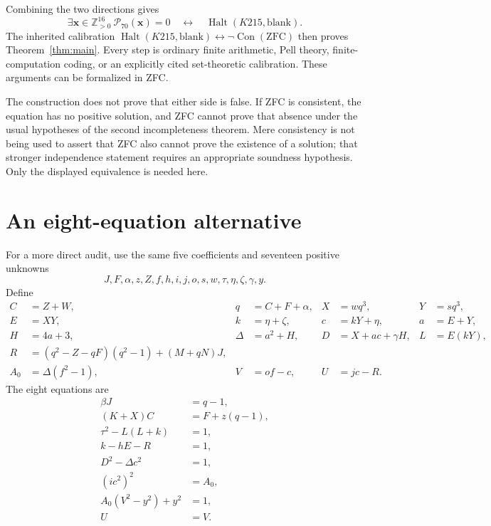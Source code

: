\documentclass[11pt]{article}
\theoremstyle{definition}
\newcommand{\Pos}{\mathbb Z_{>0}}
\newcommand{\Con}{\operatorname{Con}}
\newcommand{\Halt}{\operatorname{Halt}}
\newcommand{\norms}{\mathcal P}
\begin{document}
Combining the two directions gives
\[
 \exists\mathbf x\in\Pos^{16}\ \norms_{70}(\mathbf x)=0
 \quad\longleftrightarrow\quad
 \Halt(K215,\mathrm{blank}).
\]
The inherited calibration
$\Halt(K215,\mathrm{blank})\leftrightarrow\neg\Con(\mathrm{ZFC})$
then proves Theorem~\ref{thm:main}. Every step is ordinary finite arithmetic,
Pell theory, finite-computation coding, or an explicitly cited set-theoretic
calibration. These arguments can be formalized in ZFC.

The construction does not prove that either side is false. If ZFC is
consistent, the equation has no positive solution, and ZFC cannot prove
that absence under the usual hypotheses of the second incompleteness
theorem. Mere consistency is not being used to assert that ZFC also cannot
prove the existence of a solution; that stronger independence statement
requires an appropriate soundness hypothesis. Only the displayed
equivalence is needed here.

\section{An eight-equation alternative}
\label{sec:system}

For a more direct audit, use the same five coefficients and seventeen
positive unknowns
\[
 J,F,\alpha,z,Z,f,h,i,j,o,s,w,\tau,\eta,\zeta,\gamma,y.
\]
Define
\begin{align*}
 C&=Z+W,& q&=C+F+\alpha,& X&=wq^3,&Y&=sq^3,\\
 E&=XY,& k&=\eta+\zeta,&c&=kY+\eta,&a&=E+Y,\\
 H&=4a+3,&\Delta&=a^2+H,&D&=X+ac+\gamma H,&L&=E(kY),\\
 R&=(q^2-Z-qF)(q^2-1)+(M+qN)J,\\
 A_0&=\Delta(f^2-1),&V&=of-c,&U&=jc-R.
\end{align*}
The eight equations are
\begin{equation}\label{eq:system8}
\boxed{\begin{aligned}
 \beta J&=q-1,\\
 (K+X)C&=F+z(q-1),\\
 \tau^2-L(L+k)&=1,\\
 k-hE-R&=1,\\
 D^2-\Delta c^2&=1,\\
 (ic^2)^2&=A_0,\\
 A_0(V^2-y^2)+y^2&=1,\\
 U&=V.
\end{aligned}}
\end{equation}
\end{document}

